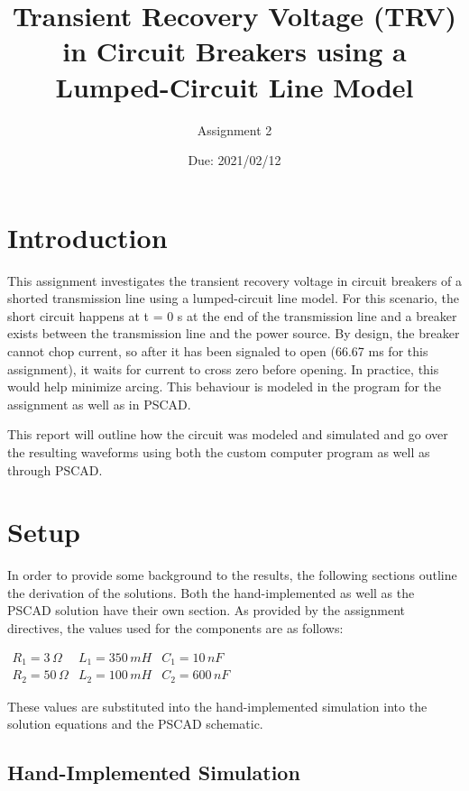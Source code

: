 \documentclass[10pt, oneside, letterpaper]{article}
\title{Transient Recovery Voltage (TRV) in Circuit Breakers using a Lumped-Circuit Line Model}
\author{Assignment 2}
\date{Due: 2021/02/12}
\begin{document}
\maketitle
\thispagestyle{fancy}

\section{Introduction}

This assignment investigates the transient recovery voltage in circuit breakers of a shorted transmission line using a lumped-circuit line model. For this scenario, the short circuit happens at t = 0 s at the end of the transmission line and a breaker exists between the transmission line and the power source. By design, the breaker cannot chop current, so after it has been signaled to open (66.67 ms for this assignment), it waits for current to cross zero before opening. In practice, this would help minimize arcing. This behaviour is modeled in the program for the assignment as well as in PSCAD.

This report will outline how the circuit was modeled and simulated and go over the resulting waveforms using both the custom computer program as well as through PSCAD.

\section{Setup}

In order to provide some background to the results, the following sections outline the derivation of the solutions. Both the hand-implemented as well as the PSCAD solution have their own section. As provided by the assignment directives, the values used for the components are as follows:

\begin{center}
$\begin{array}{ccc}
    R_1 = 3\,\Omega & L_1 = 350\,mH & C_1 = 10\,nF \\
    R_2 = 50\,\Omega & L_2 = 100\,mH & C_2 = 600\,nF
\end{array}$
\end{center}

These values are substituted into the hand-implemented simulation into the solution equations and the PSCAD schematic.

\subsection{Hand-Implemented Simulation}
\end{document}
